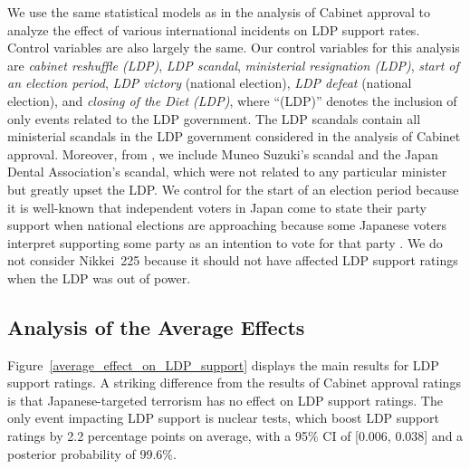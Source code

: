 \documentclass[12pt,letterpaper]{scrartcl}
\begin{document}
We use the same statistical models as in the analysis of Cabinet approval to analyze the effect of various international incidents on LDP support rates. Control variables are also largely the same. Our control variables for this analysis are \emph{cabinet reshuffle (LDP)}, \emph{LDP scandal}, \emph{ministerial resignation (LDP)}, \emph{start of an election period}, \emph{LDP victory} (national election), \emph{LDP defeat} (national election), and \emph{closing of the Diet (LDP)}, where ``(LDP)'' denotes the inclusion of only events related to the LDP government. The LDP scandals contain all ministerial scandals in the LDP government considered in the analysis of Cabinet approval. Moreover, from \citet{Carlson2018}, we include Muneo Suzuki's scandal and the Japan Dental Association's scandal, which were not related to any particular minister but greatly upset the LDP. We control for the start of an election period because it is well-known that independent voters in Japan come to state their party support when national elections are approaching \citep[e.g.,][]{Miharu2019,Nakamura2015Ehime} because some Japanese voters interpret supporting some party as an intention to vote for that party \citep{Ogura2020,Taniguchi2012}. We do not consider Nikkei~225 because it should not have affected LDP support ratings when the LDP was out of power.

\subsection{Analysis of the Average Effects}\label{app:subsec:average_effects}

Figure~\ref{average_effect_on_LDP_support} displays the main results for LDP support ratings. A striking difference from the results of Cabinet approval ratings is that Japanese-targeted terrorism has no effect on LDP support ratings. The only event impacting LDP support is nuclear tests, which boost LDP support ratings by 2.2 percentage points on average, with a 95\% CI of [0.006, 0.038] and a posterior probability of 99.6\%.
\end{document}
